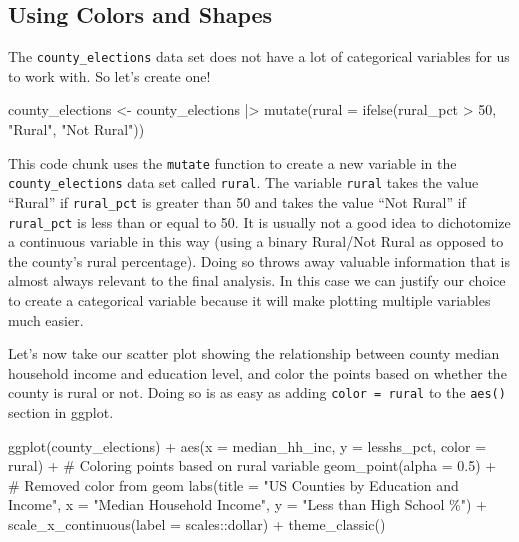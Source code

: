 \documentclass[
  letterpaper,
]{book}
\newenvironment{Shaded}{\begin{snugshade}}{\end{snugshade}}
\newcommand{\AttributeTok}[1]{\textcolor[rgb]{0.40,0.45,0.13}{#1}}
\newcommand{\CommentTok}[1]{\textcolor[rgb]{0.37,0.37,0.37}{#1}}
\newcommand{\DecValTok}[1]{\textcolor[rgb]{0.68,0.00,0.00}{#1}}
\newcommand{\FloatTok}[1]{\textcolor[rgb]{0.68,0.00,0.00}{#1}}
\newcommand{\FunctionTok}[1]{\textcolor[rgb]{0.28,0.35,0.67}{#1}}
\newcommand{\NormalTok}[1]{\textcolor[rgb]{0.00,0.23,0.31}{#1}}
\newcommand{\OtherTok}[1]{\textcolor[rgb]{0.00,0.23,0.31}{#1}}
\newcommand{\SpecialCharTok}[1]{\textcolor[rgb]{0.37,0.37,0.37}{#1}}
\newcommand{\StringTok}[1]{\textcolor[rgb]{0.13,0.47,0.30}{#1}}
\theoremstyle{definition}
\theoremstyle{definition}
\theoremstyle{plain}
\theoremstyle{definition}
\theoremstyle{plain}
\theoremstyle{plain}
\theoremstyle{remark}
\begin{document}
\hypertarget{using-colors-and-shapes}{%
\subsection{Using Colors and Shapes}\label{using-colors-and-shapes}}

The \texttt{county\_elections} data set does not have a lot of
categorical variables for us to work with. So let's create one!

\begin{Shaded}
\begin{Highlighting}[]
\NormalTok{county\_elections }\OtherTok{\textless{}{-}}\NormalTok{ county\_elections }\SpecialCharTok{|\textgreater{}} 
  \FunctionTok{mutate}\NormalTok{(}\AttributeTok{rural =} \FunctionTok{ifelse}\NormalTok{(rural\_pct }\SpecialCharTok{\textgreater{}} \DecValTok{50}\NormalTok{, }\StringTok{"Rural"}\NormalTok{, }\StringTok{"Not Rural"}\NormalTok{))}
\end{Highlighting}
\end{Shaded}

This code chunk uses the \texttt{mutate} function to create a new
variable in the \texttt{county\_elections} data set called
\texttt{rural}. The variable \texttt{rural} takes the value ``Rural'' if
\texttt{rural\_pct} is greater than 50 and takes the value ``Not Rural''
if \texttt{rural\_pct} is less than or equal to 50. It is usually not a
good idea to dichotomize a continuous variable in this way (using a
binary Rural/Not Rural as opposed to the county's rural percentage).
Doing so throws away valuable information that is almost always relevant
to the final analysis. In this case we can justify our choice to create
a categorical variable because it will make plotting multiple variables
much easier.

Let's now take our scatter plot showing the relationship between county
median household income and education level, and color the points based
on whether the county is rural or not. Doing so is as easy as adding
\texttt{color\ =\ rural} to the \texttt{aes()} section in ggplot.

\begin{Shaded}
\begin{Highlighting}[]
\FunctionTok{ggplot}\NormalTok{(county\_elections) }\SpecialCharTok{+}
  \FunctionTok{aes}\NormalTok{(}\AttributeTok{x =}\NormalTok{ median\_hh\_inc, }\AttributeTok{y =}\NormalTok{ lesshs\_pct,}
      \AttributeTok{color =}\NormalTok{ rural) }\SpecialCharTok{+} \CommentTok{\# Coloring points based on rural variable}
  \FunctionTok{geom\_point}\NormalTok{(}\AttributeTok{alpha =} \FloatTok{0.5}\NormalTok{) }\SpecialCharTok{+} \CommentTok{\# Removed color from geom}
  \FunctionTok{labs}\NormalTok{(}\AttributeTok{title =} \StringTok{"US Counties by Education and Income"}\NormalTok{,}
       \AttributeTok{x =} \StringTok{"Median Household Income"}\NormalTok{,}
       \AttributeTok{y =} \StringTok{"Less than High School \%"}\NormalTok{) }\SpecialCharTok{+}
  \FunctionTok{scale\_x\_continuous}\NormalTok{(}\AttributeTok{label =}\NormalTok{ scales}\SpecialCharTok{::}\NormalTok{dollar) }\SpecialCharTok{+}
  \FunctionTok{theme\_classic}\NormalTok{()}
\end{Highlighting}
\end{Shaded}
\end{document}
